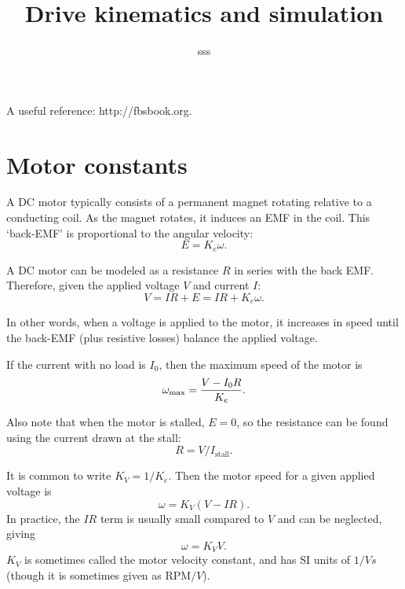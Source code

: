 \documentclass[12pt]{article}
\begin{document}
\title{Drive kinematics and simulation}
\author{sss}
\maketitle

A useful reference: http://fbsbook.org.

\section{Motor constants}

A DC motor typically consists of a permanent magnet rotating relative
to a conducting coil.  As the magnet rotates, it induces an EMF in the
coil.  This `back-EMF' is proportional to the angular velocity:
\begin{equation}
  E = K_e \omega .
\end{equation}

A DC motor can be modeled as a resistance $R$ in series with the back EMF.
Therefore, given the applied voltage $V$ and current $I$:
\begin{equation}
  V = IR + E = IR + K_e \omega.
\end{equation}

In other words, when a voltage is applied to the motor, it increases in speed
until the back-EMF (plus resistive losses) balance the applied voltage.

If the current with no load is $I_0$, then the maximum speed of the motor
is
\begin{equation}
  \omega_{\max} = {V-I_0R \over K_e}.
\end{equation}

Also note that when the motor is stalled, $E=0$, so the resistance
can be found using the current drawn at the stall:
\begin{equation}
  R = V / I_{\mathrm{stall}}.
\end{equation}

It is common to write $K_V = 1/K_e$.  Then the motor speed for a given applied
voltage is
\begin{equation}
  \omega = K_V (V-IR).
\end{equation}
In practice, the $IR$ term is usually small compared to $V$ and can be
neglected, giving
\begin{equation}
  \omega = K_V V.
\end{equation}
$K_V$ is sometimes called the motor velocity constant, and has SI units
of $1/Vs$ (though it is sometimes given as $\textrm{RPM}/V$).
\end{document}
